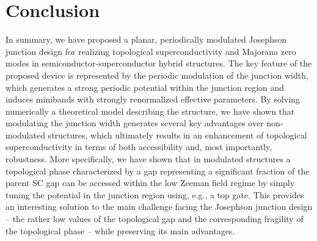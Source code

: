 \documentclass[twocolumn,aps,prb,nofootinbib]{revtex4-2}
\begin{document}
\section{Conclusion} \label{Conclusion}

In summary, we have proposed a planar, periodically modulated  Josephson junction design for realizing topological superconductivity and Majorana zero modes in semiconductor-superconductor hybrid structures. The key feature of the proposed device is represented by the periodic modulation of the junction width, which generates a strong periodic potential within the junction region and induces minibands with strongly renormalized effective parameters. By solving numerically a theoretical model describing the structure, we have shown that modulating the junction width generates several key advantages over non-modulated structures, which ultimately results in an enhancement of topological superconductivity in terms of both accessibility and, most importantly, robustness. More specifically, we have shown that in modulated structures a topological phase characterized by a gap representing a significant fraction of the parent SC gap can be accessed within the low Zeeman field regime by simply tuning the potential in the junction region using, e.g., a top gate. This provides an interesting solution to the main challenge facing the Josephson junction design -- the rather low values of the topological gap and the corresponding fragility of the topological phase -- while preserving its main advantages.
 
\end{document}
